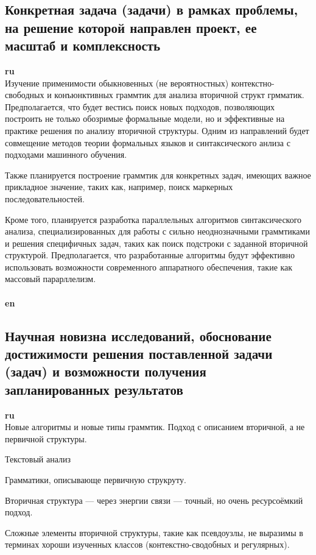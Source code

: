 \documentclass[12pt]{article}  %
\theoremstyle{remark}
\begin{document}
\subsection{Конкретная задача (задачи) в рамках проблемы, на решение которой направлен проект, ее масштаб и комплексность}

\textbf{ru}\\
Изучение применимости обыкновенных (не вероятностных) контекстно-свободных и конъюнктивных граммтик для анализа вторичной структ грмматик. 
Предполагается, что будет вестись поиск новых подходов, позволяющих построить не только обозримые формальные модели, но и эффективные на практике решения по анализу вторичной структуры. 
Одним из направлений будет совмещение методов теории формальных языков и синтаксического анлиза с подходами машинного обучения.

Также планируется построение граммтик для конкретных задач, имеющих важное прикладное значение, таких как, например, поиск маркерных последовательностей.

Кроме того, планируется разработка параллельных алгоритмов синтаксического анализа, специализированных для работы с сильно неоднозначными граммтиками и решения специфичных задач, таких как поиск подстроки с заданной вторичной структурой.
Предполагается, что разработанные алгоритмы будут эффективно использовать возможности современного аппаратного обеспечения, такие как массовый парарллелизм.
\\
\\
\textbf{en}\\


\subsection{Научная новизна исследований, обоснование достижимости решения поставленной задачи (задач) и возможности получения запланированных результатов}

\textbf{ru}\\
Новые алгоритмы и новые типы граммтик. 
Подход с описанием вторичной, а не первичной структуры.

Текстовый анализ

Грамматики, описывающе первичную струкруту.

Вторичная структура --- через энергии связи --- точный, но очень ресурсоёмкий подход.

Сложные элементы вторичной структуры, такие как псевдоузлы, не выразимы в терминах хороши изученных классов (контекстно-сводобных и регулярных).
\end{document}
